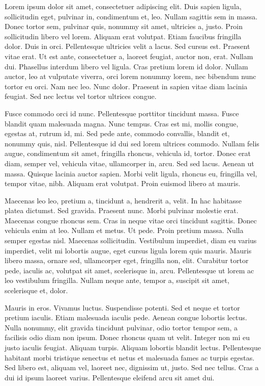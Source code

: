 
Lorem ipsum dolor sit amet, consectetuer adipiscing elit. Duis
sapien ligula, sollicitudin eget, pulvinar in, condimentum et,
leo. Nullam sagittis sem in massa. Donec tortor sem, pulvinar
quis, nonummy sit amet, ultricies a, justo. Proin sollicitudin
libero vel lorem. Aliquam erat volutpat. Etiam faucibus fringilla
dolor. Duis in orci. Pellentesque ultricies velit a lacus. Sed
cursus est. Praesent vitae erat. Ut est ante, consectetuer a,
laoreet feugiat, auctor non, erat. Nullam dui. Phasellus interdum
libero vel ligula. Cras pretium lorem id dolor. Nullam auctor,
leo at vulputate viverra, orci lorem nonummy lorem, nec bibendum
nunc tortor eu orci. Nam nec leo. Nunc dolor. Praesent in sapien
vitae diam lacinia feugiat. Sed nec lectus vel tortor ultrices
congue.

Fusce commodo orci id nunc. Pellentesque porttitor tincidunt
massa. Fusce blandit quam malesuada magna. Nunc tempus. Cras est
mi, mollis congue, egestas at, rutrum id, mi. Sed pede ante,
commodo convallis, blandit et, nonummy quis, nisl. Pellentesque
id dui sed lorem ultrices commodo. Nullam felis augue,
condimentum sit amet, fringilla rhoncus, vehicula id, tortor.
Donec erat diam, semper vel, vehicula vitae, ullamcorper in,
arcu. Sed sed lacus. Aenean ut massa. Quisque lacinia auctor
sapien. Morbi velit ligula, rhoncus eu, fringilla vel, tempor
vitae, nibh. Aliquam erat volutpat. Proin euismod libero at
mauris.

Maecenas leo leo, pretium a, tincidunt a, hendrerit a, velit. In
hac habitasse platea dictumst. Sed gravida. Praesent nunc. Morbi
pulvinar molestie erat. Maecenas congue rhoncus sem. Cras in
neque vitae orci tincidunt sagittis. Donec vehicula enim at leo.
Nullam et metus. Ut pede. Proin pretium massa. Nulla semper
egestas nisl. Maecenas sollicitudin. Vestibulum imperdiet, diam
eu varius imperdiet, velit mi lobortis augue, eget cursus ligula
lorem quis mauris. Mauris libero massa, ornare sed, ullamcorper
eget, fringilla non, elit. Curabitur tortor pede, iaculis ac,
volutpat sit amet, scelerisque in, arcu. Pellentesque ut lorem ac
leo vestibulum fringilla. Nullam neque ante, tempor a, suscipit
sit amet, scelerisque et, dolor.

Mauris in eros. Vivamus luctus. Suspendisse potenti. Sed et neque
et tortor pretium iaculis. Etiam malesuada iaculis pede. Aenean
congue lobortis lectus. Nulla nonummy, elit gravida tincidunt
pulvinar, odio tortor tempor sem, a facilisis odio diam non
ipsum. Donec rhoncus quam ut velit. Integer non mi eu justo
iaculis feugiat. Aliquam turpis. Aliquam lobortis blandit lectus.
Pellentesque habitant morbi tristique senectus et netus et
malesuada fames ac turpis egestas. Sed libero est, aliquam vel,
laoreet nec, dignissim ut, justo. Sed nec tellus. Cras a dui id
ipsum laoreet varius. Pellentesque eleifend arcu sit amet dui.

